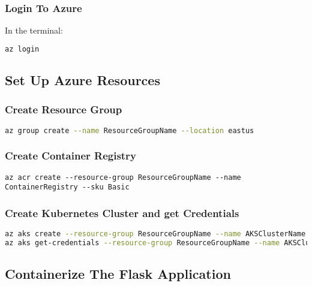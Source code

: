 \documentclass{article}
\begin{document}
		\subsubsection{Login To Azure}
In the terminal:
\begin{lstlisting}[language=bash]
az login
\end{lstlisting}
	\subsection{Set Up Azure Resources}
		\subsubsection{Create Resource Group}
\begin{lstlisting}[language=bash]
az group create --name ResourceGroupName --location eastus
\end{lstlisting}
		\subsubsection{Create Container Registry}
\begin{lstlisting}
az acr create --resource-group ResourceGroupName --name ContainerRegistry --sku Basic
\end{lstlisting}
		\subsubsection{Create Kubernetes Cluster and get Credentials}
\begin{lstlisting}[language=bash]
az aks create --resource-group ResourceGroupName --name AKSClusterName --node-count 1 --enable-addons monitoring --generate-ssh-keys
az aks get-credentials --resource-group ResourceGroupName --name AKSClusterName
\end{lstlisting}
	\subsection{Containerize The Flask Application}
\end{document}
